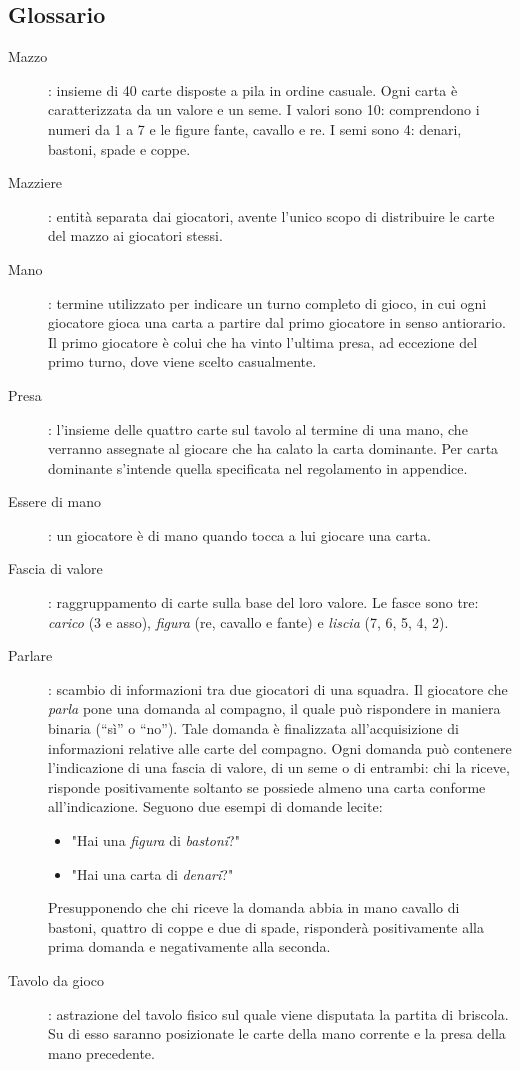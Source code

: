 \documentclass[a4paper,12pt]{article}
\begin{document}
\subsection{Glossario} \label{glossary}

\begin{description}
	\item[Mazzo]: insieme di 40 carte disposte a pila in ordine casuale. Ogni carta è caratterizzata da un valore e un seme. I valori sono 10: comprendono i numeri da 1 a 7 e le figure fante, cavallo e re. I semi sono 4: denari, bastoni, spade e coppe.
	\item[Mazziere]: entità separata dai giocatori, avente l'unico scopo di distribuire le carte del mazzo ai giocatori stessi. 
	\item[Mano]: termine utilizzato per indicare un turno completo di gioco, in cui ogni giocatore gioca una carta a partire dal primo giocatore in senso antiorario. Il primo giocatore è colui che ha vinto l'ultima presa, ad eccezione del primo turno, dove viene scelto casualmente.
	\item[Presa]: l'insieme delle quattro carte sul tavolo al termine di una mano, che verranno assegnate al giocare che ha calato la carta dominante. Per carta dominante s'intende quella specificata nel regolamento in appendice.
	\item[Essere di mano]: un giocatore è di mano quando tocca a lui giocare una carta.
	\item[Fascia di valore]: raggruppamento di carte sulla base del loro valore. Le fasce sono tre: \emph{carico} (3 e asso), \emph{figura} (re, cavallo e fante) e \emph{liscia} (7, 6, 5, 4, 2).
	\item[Parlare]: scambio di informazioni tra due giocatori di una squadra. Il giocatore che \emph{parla} pone una domanda al compagno, il quale può rispondere in maniera binaria (``sì'' o ``no''). Tale domanda è finalizzata all'acquisizione di informazioni relative alle carte del compagno. Ogni domanda può contenere l'indicazione di una fascia di valore, di un seme o di entrambi: chi la riceve, risponde positivamente soltanto se possiede almeno una carta conforme all'indicazione. Seguono due esempi di domande lecite:
	\begin{itemize}
		\item "Hai una \emph{figura} di \emph{bastoni}?"
		\item "Hai una carta di \emph{denari}?"
	\end{itemize} 
	Presupponendo che chi riceve la domanda abbia in mano cavallo di bastoni, quattro di coppe e due di spade, risponderà positivamente alla prima domanda e negativamente alla seconda.   
	\item[Tavolo da gioco]: astrazione del tavolo fisico sul quale viene disputata la partita di briscola. Su di esso saranno posizionate le carte della mano corrente e la presa della mano precedente.
\end{description}
\end{document}
